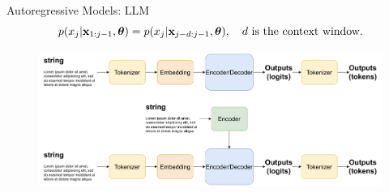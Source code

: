 \documentclass{beamer}
\begin{document}
\begin{frame}{Autoregressive Models: LLM}
	$$
		p(x_j | \mathbf{x}_{1:j - 1}, \boldsymbol{\theta}) = p(x_j | \mathbf{x}_{j - d:j - 1}, \boldsymbol{\theta}),\quad d\ \text{is the context window}.
	$$
	 \begin{figure}
		   \centering
		   \includegraphics[width=1.0\linewidth]{figs/llm_modeling}
	 \end{figure}
\end{frame}
\end{document}
